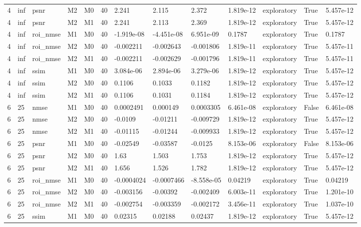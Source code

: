 \begin{tabular}{lllllllllllll}
4 & inf & psnr & M2 & M0 & 40 & 2.241 & 2.115 & 2.372 & 1.819e-12 & exploratory & True & 5.457e-12 \\
4 & inf & psnr & M2 & M1 & 40 & 2.241 & 2.113 & 2.369 & 1.819e-12 & exploratory & True & 5.457e-12 \\
4 & inf & roi\_nmse & M1 & M0 & 40 & -1.919e-08 & -4.451e-08 & 6.951e-09 & 0.1787 & exploratory & True & 0.1787 \\
4 & inf & roi\_nmse & M2 & M0 & 40 & -0.002211 & -0.002643 & -0.001806 & 1.819e-11 & exploratory & True & 5.457e-11 \\
4 & inf & roi\_nmse & M2 & M1 & 40 & -0.002211 & -0.002629 & -0.001796 & 1.819e-11 & exploratory & True & 5.457e-11 \\
4 & inf & ssim & M1 & M0 & 40 & 3.084e-06 & 2.894e-06 & 3.279e-06 & 1.819e-12 & exploratory & True & 5.457e-12 \\
4 & inf & ssim & M2 & M0 & 40 & 0.1106 & 0.1033 & 0.1182 & 1.819e-12 & exploratory & True & 5.457e-12 \\
4 & inf & ssim & M2 & M1 & 40 & 0.1106 & 0.1031 & 0.1184 & 1.819e-12 & exploratory & True & 5.457e-12 \\
6 & 25 & nmse & M1 & M0 & 40 & 0.0002491 & 0.000149 & 0.0003305 & 6.461e-08 & exploratory & False & 6.461e-08 \\
6 & 25 & nmse & M2 & M0 & 40 & -0.0109 & -0.01211 & -0.009729 & 1.819e-12 & exploratory & True & 5.457e-12 \\
6 & 25 & nmse & M2 & M1 & 40 & -0.01115 & -0.01244 & -0.009933 & 1.819e-12 & exploratory & True & 5.457e-12 \\
6 & 25 & psnr & M1 & M0 & 40 & -0.02549 & -0.03587 & -0.0125 & 8.153e-06 & exploratory & False & 8.153e-06 \\
6 & 25 & psnr & M2 & M0 & 40 & 1.63 & 1.503 & 1.753 & 1.819e-12 & exploratory & True & 5.457e-12 \\
6 & 25 & psnr & M2 & M1 & 40 & 1.656 & 1.526 & 1.782 & 1.819e-12 & exploratory & True & 5.457e-12 \\
6 & 25 & roi\_nmse & M1 & M0 & 40 & -0.0004024 & -0.0007466 & -8.558e-05 & 0.04219 & exploratory & True & 0.04219 \\
6 & 25 & roi\_nmse & M2 & M0 & 40 & -0.003156 & -0.00392 & -0.002409 & 6.003e-11 & exploratory & True & 1.201e-10 \\
6 & 25 & roi\_nmse & M2 & M1 & 40 & -0.002754 & -0.003359 & -0.002172 & 3.456e-11 & exploratory & True & 1.037e-10 \\
6 & 25 & ssim & M1 & M0 & 40 & 0.02315 & 0.02188 & 0.02437 & 1.819e-12 & exploratory & True & 5.457e-12 \\

\end{tabular}

